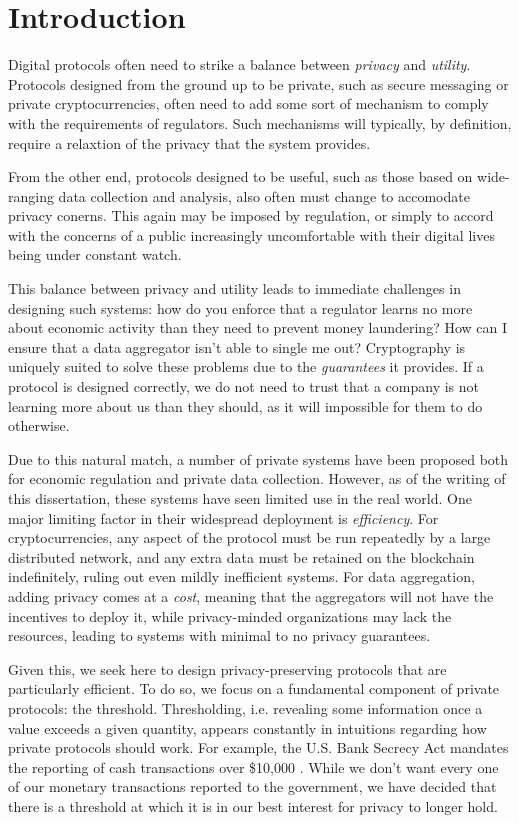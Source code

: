 \chapter{Introduction}
\label{chap:introduction}

Digital protocols often need to strike a balance between \emph{privacy} and \emph{utility}.
Protocols designed from the ground up to be private, such as secure messaging or private cryptocurrencies, often need to add some sort of mechanism to comply with the requirements of regulators.
Such mechanisms will typically, by definition, require a relaxtion of the privacy that the system provides.

From the other end, protocols designed to be useful, such as those based on wide-ranging data collection and analysis, also often must change to accomodate privacy conerns.
This again may be imposed by regulation, or simply to accord with the concerns of a public increasingly uncomfortable with their digital lives being under constant watch.

This balance between privacy and utility leads to immediate challenges in designing such systems: how do you enforce that a regulator learns no more about economic activity than they need to prevent money laundering? How can I ensure that a data aggregator isn't able to single me out?
Cryptography is uniquely suited to solve these problems due to the \emph{guarantees} it provides.
If a protocol is designed correctly, we do not need to trust that a company is not learning more about us than they should, as it will impossible for them to do otherwise.

Due to this natural match, a number of private systems have been proposed both for economic regulation and private data collection.
However, as of the writing of this dissertation, these systems have seen limited use in the real world.
One major limiting factor in their widespread deployment is \emph{efficiency}.
For cryptocurrencies, any aspect of the protocol must be run repeatedly by a large distributed network, and any extra data must be retained on the blockchain indefinitely, ruling out even mildly inefficient systems.
For data aggregation, adding privacy comes at a \emph{cost}, meaning that the aggregators will not have the incentives to deploy it, while privacy-minded organizations may lack the resources, leading to systems with minimal to no privacy guarantees.


Given this, we seek here to design privacy-preserving protocols that are particularly efficient.
To do so, we focus on a fundamental component of private protocols: the threshold.
Thresholding, i.e. revealing some information once a value exceeds a given quantity, appears constantly in intuitions regarding how private protocols should work.
For example, the U.S. Bank Secrecy Act mandates the reporting of cash transactions over \$10,000 \cite{meltzer1991keeping}.
While we don't want every one of our monetary transactions reported to the government, we have decided that there is a threshold at which it is in our best interest for privacy to longer hold.

